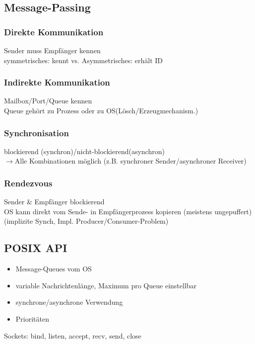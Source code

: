 \subsection{Message-Passing}

\subsubsection{Direkte Kommunikation}
Sender muss Empfänger kennen\\
symmetrisches: kennt vs. Asymmetrisches: erhält ID

\subsubsection{Indirekte Kommunikation}
Mailbox/Port/Queue kennen\\
Queue gehört zu Prozess oder zu OS(Lösch/Erzeugmechanism.)

\subsubsection{Synchronisation}
blockierend (synchron)/nicht-blockierend(asynchron)\\
$\rightarrow$Alle Kombinationen möglich (z.B. synchroner Sender/asynchroner Receiver)

\subsubsection{Rendezvous}
Sender \& Empfänger blockierend\\
OS kann direkt vom Sende- in Empfängerprozess kopieren (meistens ungepuffert)
(implizite Synch, Impl. Producer/Consumer-Problem)



\subsection{POSIX API}
\begin{itemize}
    \item Message-Queues vom OS
    \item variable Nachrichtenlänge, Maximum pro Queue einstellbar
    \item synchrone/asynchrone Verwendung
    \item Prioritäten
\end{itemize}
Sockets: bind, listen, accept, recv, send, close

